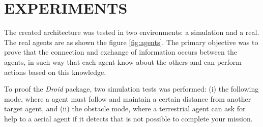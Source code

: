 \section{EXPERIMENTS}
\label{sec:experiments}

The created architecture was tested in two environments: a simulation and a real.
The real agents are as shown the figure \ref{fig:agents}.
The primary objective was to prove that the connection and exchange of information occurs between the agents, in such way that each agent know about the others and can perform actions based on this knowledge.

To proof the \emph{Droid} package, two simulation tests was performed: (i) the following mode, where a agent must follow and maintain a certain distance from another target agent, and (ii) the obstacle mode, where a terrestrial agent can ask for help to a aerial agent if it detects that is not possible to complete your mission.

